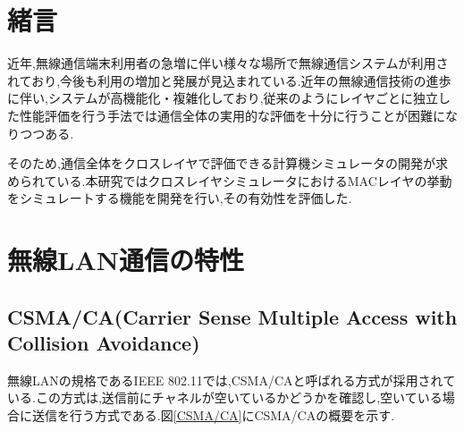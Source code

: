 \documentclass[a4paper, 10pt]{ltjsarticle}
\begin{document}
\setlength{\columnsep}{7.5mm}

\twocolumn[
    \begin{center}
        {\vspace{-1em}}

        {\fontsize{15pt}{15pt}\selectfont{クロスレイヤシミュレータ開発における無線LANシミュレータの開発}}

        {\vspace{1.3em}}

        {\fontsize{13pt}{13pt}\selectfont{Development of a Wireless LAN Simulator for Cross-Layer Simulator Development }}
    \end{center}

    \vspace{0.1em}

    \begin{flushright}
      {\fontsize{11pt}{11pt}\selectfont{T5-16 \; 下沢亮太郎}}
      \\
      {\fontsize{11pt}{11pt}\selectfont{指導教員 \; 設樂勇}}
    \end{flushright}

    \vspace{1em}

    \thispagestyle{empty}
]

\section{緒言}
近年,無線通信端末利用者の急増に伴い様々な場所で無線通信システムが利用されており,今後も利用の増加と発展が見込まれている.近年の無線通信技術の進歩に伴い,システムが高機能化・複雑化しており,従来のようにレイヤごとに独立した性能評価を行う手法では通信全体の実用的な評価を十分に行うことが困難になりつつある.

そのため,通信全体をクロスレイヤで評価できる計算機シミュレータの開発が求められている.本研究ではクロスレイヤシミュレータにおけるMACレイヤの挙動をシミュレートする機能を開発を行い,その有効性を評価した.


\section{無線LAN通信の特性}
\subsection{CSMA/CA(Carrier Sense Multiple Access with Collision Avoidance)}
無線LANの規格であるIEEE 802.11では,CSMA/CAと呼ばれる方式が採用されている.この方式は,送信前にチャネルが空いているかどうかを確認し,空いている場合に送信を行う方式である.図\ref{CSMA/CA}にCSMA/CAの概要を示す.
\end{document}
